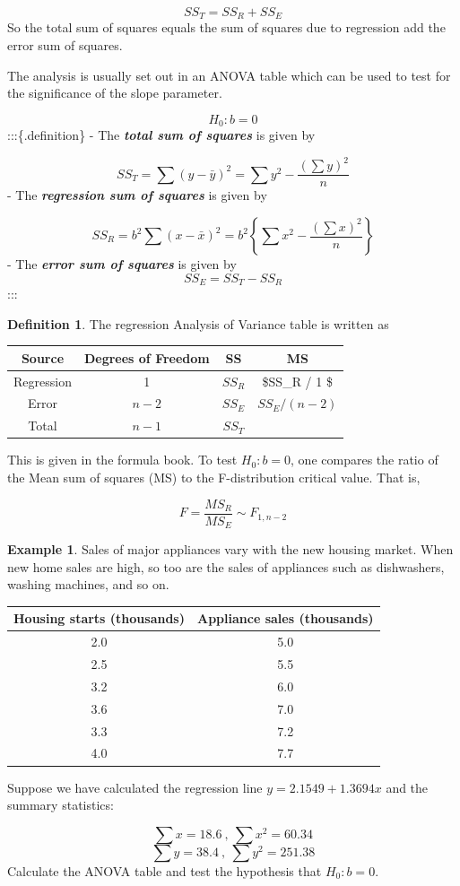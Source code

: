 \documentclass[
]{book}
\theoremstyle{definition}
\newtheorem{definition}{Definition}[chapter]
\theoremstyle{definition}
\newtheorem{example}{Example}[chapter]
\theoremstyle{definition}
\theoremstyle{definition}
\theoremstyle{remark}
\begin{document}
\[SS_{T} =  SS_R + SS_E\]
So the total sum of squares equals the sum of squares due to regression add the error sum of squares.

The analysis is usually set out in an ANOVA table which can be used to test for the significance of the slope parameter.

\[H_0 : b=0\]
:::\{.definition\}
- The \textbf{\emph{total sum of squares}} is given by

\[SS_T = \sum (y-\bar{y})^2= \sum y^2 - \frac{(\sum y)^2}{n}\]
- The \textbf{\emph{regression sum of squares}} is given by

\[SS_R = b^2\sum(x-\bar{x})^2 = b^2 \left\{ \sum x^2 - \frac{(\sum x)^2}{n}\right\}\]
- The \textbf{\emph{error sum of squares}} is given by
\[SS_E=SS_T-SS_R \]
:::

\begin{definition}
The regression Analysis of Variance table is written as

\begin{longtable}[]{@{}cccc@{}}
\toprule
Source & Degrees of Freedom & SS & MS\tabularnewline
\midrule
\endhead
Regression & 1 & \(SS_R\) & \$SS\_R / 1 \$\tabularnewline
Error & \(n-2\) & \(SS_E\) & \(SS_E / (n-2)\)\tabularnewline
Total & \(n-1\) & \(SS_T\) &\tabularnewline
\bottomrule
\end{longtable}

This is given in the formula book. To test \(H_0 : b = 0\), one compares the ratio of the Mean sum of squares (MS) to the F-distribution critical value. That is,

\[F=\frac{MS_R}{MS_E}\sim F_{1,n-2} \]
\end{definition}

\begin{example}
Sales of major appliances vary with the new housing market. When new home sales are high, so too are the sales of appliances such as dishwashers, washing machines, and so on.

\begin{longtable}[]{@{}cc@{}}
\toprule
Housing starts (thousands) & Appliance sales (thousands)\tabularnewline
\midrule
\endhead
2.0 & 5.0\tabularnewline
2.5 & 5.5\tabularnewline
3.2 & 6.0\tabularnewline
3.6 & 7.0\tabularnewline
3.3 & 7.2\tabularnewline
4.0 & 7.7\tabularnewline
\bottomrule
\end{longtable}

Suppose we have calculated the regression line \(y=2.1549 + 1.3694x\) and the summary statistics:

\[\sum x = 18.6 \ , \ \sum x^2 = 60.34\]
\[\sum y = 38.4 \ , \ \sum y^2 = 251.38\]
Calculate the ANOVA table and test the hypothesis that \(H_0 : b = 0\).
\end{example}
\end{document}
